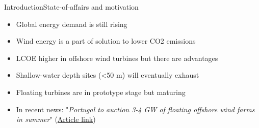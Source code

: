 \begin{frame}{Introduction}{State-of-affairs and motivation}
	\begin{itemize}
		\item Global energy demand is still rising
		\item Wind energy is a part of solution to lower CO2 emissions
		\item LCOE higher in offshore wind turbines but there are advantages
		\item Shallow-water depth sites (<50 m) will eventually exhaust
		\item Floating turbines are in prototype stage but maturing
		\item In recent news: "\textit{Portugal to auction 3-4 GW of floating offshore wind farms in summer}" (\href{https://www.reuters.com/business/energy/portugal-auction-3-4-gw-floating-offshore-wind-farms-summer-2022-03-16/}{Article link})
	\end{itemize}\bigskip
\end{frame}


